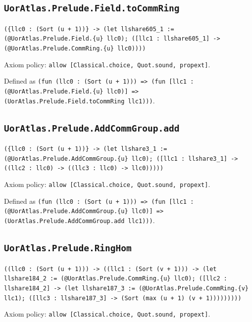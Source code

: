 \documentclass[11pt]{article}
\begin{document}
\subsection*{\texttt{UorAtlas.Prelude.Field.toCommRing}}
\noindent\texttt{(\{llc0 : (Sort (u + 1))\} -> (let llshare605\_1 := (@UorAtlas.Prelude.Field.\{u\} llc0); ([llc1 : llshare605\_1] -> (@UorAtlas.Prelude.CommRing.\{u\} llc0))))}\par
\noindent Axiom policy: \texttt{allow [Classical.choice, Quot.sound, propext]}.\par
\noindent Defined as \texttt{(fun (llc0 : (Sort (u + 1))) => (fun [llc1 : (@UorAtlas.Prelude.Field.\{u\} llc0)] => (UorAtlas.Prelude.Field.toCommRing llc1)))}.\par
\subsection*{\texttt{UorAtlas.Prelude.AddCommGroup.add}}
\noindent\texttt{(\{llc0 : (Sort (u + 1))\} -> (let llshare3\_1 := (@UorAtlas.Prelude.AddCommGroup.\{u\} llc0); ([llc1 : llshare3\_1] -> ((llc2 : llc0) -> ((llc3 : llc0) -> llc0)))))}\par
\noindent Axiom policy: \texttt{allow [Classical.choice, Quot.sound, propext]}.\par
\noindent Defined as \texttt{(fun (llc0 : (Sort (u + 1))) => (fun [llc1 : (@UorAtlas.Prelude.AddCommGroup.\{u\} llc0)] => (UorAtlas.Prelude.AddCommGroup.add llc1)))}.\par
\subsection*{\texttt{UorAtlas.Prelude.RingHom}}
\noindent\texttt{((llc0 : (Sort (u + 1))) -> ((llc1 : (Sort (v + 1))) -> (let llshare184\_2 := (@UorAtlas.Prelude.CommRing.\{u\} llc0); ([llc2 : llshare184\_2] -> (let llshare187\_3 := (@UorAtlas.Prelude.CommRing.\{v\} llc1); ([llc3 : llshare187\_3] -> (Sort (max (u + 1) (v + 1)))))))))}\par
\noindent Axiom policy: \texttt{allow [Classical.choice, Quot.sound, propext]}.\par
\end{document}
